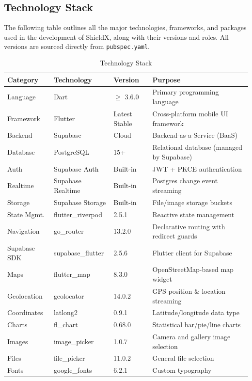 \documentclass[12pt, a4paper, twoside, openany]{report}
\begin{document}
\subsection{Technology Stack}
The following table outlines all the major technologies, frameworks, and packages used in the development of ShieldX, along with their versions and roles. All versions are sourced directly from \texttt{pubspec.yaml}.
\begin{table}[ht]
\centering
\caption{Technology Stack}
\label{tab:techstack}
\begin{tabularx}{\textwidth}{lllX}
\toprule
\textbf{Category} & \textbf{Technology} & \textbf{Version} & \textbf{Purpose} \\
\midrule
Language & Dart & $\geq$ 3.6.0 & Primary programming language \\
Framework & Flutter & Latest Stable & Cross-platform mobile UI framework \\
\addlinespace
Backend & Supabase & Cloud & Backend-as-a-Service (BaaS) \\
Database & PostgreSQL & 15+ & Relational database (managed by Supabase) \\
Auth & Supabase Auth & Built-in & JWT + PKCE authentication \\
Realtime & Supabase Realtime & Built-in & Postgres change event streaming \\
Storage & Supabase Storage & Built-in & File/image storage buckets \\
\addlinespace
State Mgmt. & flutter\_riverpod & 2.5.1 & Reactive state management \\
Navigation & go\_router & 13.2.0 & Declarative routing with redirect guards \\
Supabase SDK & supabase\_flutter & 2.5.6 & Flutter client for Supabase \\
\addlinespace
Maps & flutter\_map & 8.3.0 & OpenStreetMap-based map widget \\
Geolocation & geolocator & 14.0.2 & GPS position \& location streaming \\
Coordinates & latlong2 & 0.9.1 & Latitude/longitude data type \\
\addlinespace
Charts & fl\_chart & 0.68.0 & Statistical bar/pie/line charts \\
Images & image\_picker & 1.0.7 & Camera and gallery image selection \\
Files & file\_picker & 11.0.2 & General file selection \\
\addlinespace
Fonts & google\_fonts & 6.2.1 & Custom typography \\

\end{tabularx}
\end{table}
\end{document}
